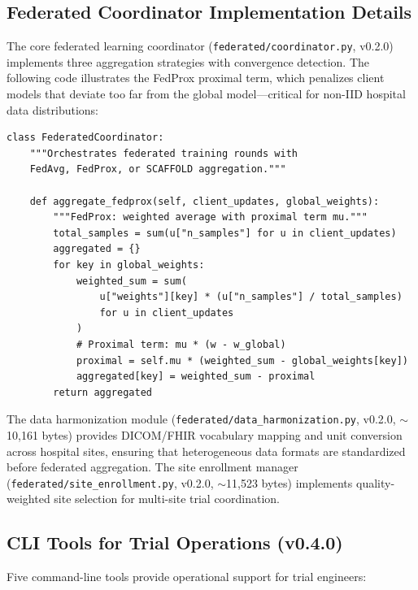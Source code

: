 \documentclass[10pt]{article}
\begin{document}
\subsection{Federated Coordinator Implementation Details}

The core federated learning coordinator (\texttt{federated/coordinator.py}, v0.2.0) implements three aggregation strategies with convergence detection. The following code illustrates the FedProx proximal term, which penalizes client models that deviate too far from the global model---critical for non-IID hospital data distributions:

\begin{lstlisting}[caption={FedProx aggregation with proximal regularization from \texttt{federated/coordinator.py} (v0.2.0)}]
class FederatedCoordinator:
    """Orchestrates federated training rounds with
    FedAvg, FedProx, or SCAFFOLD aggregation."""

    def aggregate_fedprox(self, client_updates, global_weights):
        """FedProx: weighted average with proximal term mu."""
        total_samples = sum(u["n_samples"] for u in client_updates)
        aggregated = {}
        for key in global_weights:
            weighted_sum = sum(
                u["weights"][key] * (u["n_samples"] / total_samples)
                for u in client_updates
            )
            # Proximal term: mu * (w - w_global)
            proximal = self.mu * (weighted_sum - global_weights[key])
            aggregated[key] = weighted_sum - proximal
        return aggregated
\end{lstlisting}

The data harmonization module (\texttt{federated/data\_harmonization.py}, v0.2.0, $\sim$10,161 bytes) provides DICOM/FHIR vocabulary mapping and unit conversion across hospital sites, ensuring that heterogeneous data formats are standardized before federated aggregation. The site enrollment manager (\texttt{federated/site\_enrollment.py}, v0.2.0, $\sim$11,523 bytes) implements quality-weighted site selection for multi-site trial coordination.

\subsection{CLI Tools for Trial Operations (v0.4.0)}

Five command-line tools provide operational support for trial engineers:
\end{document}
